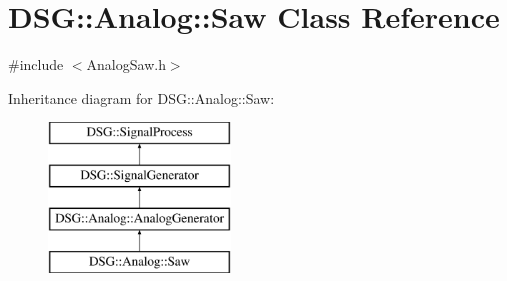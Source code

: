 \hypertarget{classDSG_1_1Analog_1_1Saw}{\section{D\-S\-G\-:\-:Analog\-:\-:Saw Class Reference}
\label{classDSG_1_1Analog_1_1Saw}
}


{\ttfamily \#include $<$Analog\-Saw.\-h$>$}

Inheritance diagram for D\-S\-G\-:\-:Analog\-:\-:Saw\-:\begin{figure}[H]
\begin{center}
\leavevmode
\includegraphics[height=4.000000cm]{classDSG_1_1Analog_1_1Saw}
\end{center}
\end{figure}
